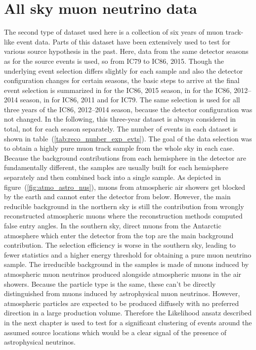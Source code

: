 \section{All sky muon neutrino data}
The second type of dataset used here is a collection of six years of muon track-like event data.
Parts of this dataset have been extensively used to test for various source hypothesis in the past.
Here, data from the same detector seasons as for the source events is used, so from IC79 to IC86, 2015.
Though the underlying event selection differs slightly for each sample and also the detector configuration changes for certain seasons, the basic steps to arrive at the final event selection is summarized in \cite{Aartsen:2016qbu} for the IC86, 2015 season, in \cite{Aartsen:2016oji} for the IC86, 2012--2014 season, in \cite{Aartsen:2013uuv} for IC86, 2011 and \cite{Aartsen:2014PS4yrs} for IC79.
The same selection is used for all three years of the IC86, 2012--2014 season, because the detector configuration was not changed.
In the following, this three-year dataset is always considered in total, not for each season separately.
The number of events in each dataset is shown in table~(\ref{tab:reco_nunber_exp_evts}).
The goal of the data selection was to obtain a highly pure muon track sample from the whole sky in each case.
Because the background contributions from each hemisphere in the detector are fundamentally different, the samples are usually built for each hemisphere separately and then combined back into a single sample.
As depicted in figure~(\ref{fig:atmo_astro_nus}), muons from atmospheric air showers get blocked by the earth and cannot enter the detector from below.
However, the main reducible background in the northern sky is still the contribution from wrongly reconstructed atmospheric muons where the reconstruction methods computed false entry angles.
In the southern sky, direct muons from the Antarctic atmosphere which enter the detector from the top are the main background contribution.
The selection efficiency is worse in the southern sky, leading to fewer statistics and a higher energy threshold for obtaining a pure muon neutrino sample.
The irreducible background in the samples is made of muons induced by atmospheric muon neutrinos produced alongside atmospheric muons in the air showers.
Because the particle type is the same, these can't be directly distinguished from muons induced by astrophysical muon neutrinos.
However, atmospheric particles are expected to be produced diffusely with no preferred direction in a large production volume.
Therefore the Likelihood ansatz described in the next chapter is used to test for a significant clustering of events around the assumed source locations which would be a clear signal of the presence of astrophysical neutrinos.

